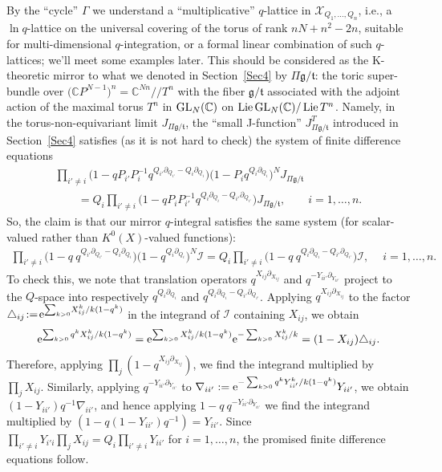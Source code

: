 \documentclass[10pt,a4paper]{amsart}
\numberwithin{equation}{section}
\def\I{\mathcal I}
\def\X{\mathcal X}
\def\CC{\mathbb C}
\def\p{\partial}
\def\Lie{\operatorname{Lie}}
\renewcommand{\Delta}{\triangle}
\theoremstyle{definition}
\theoremstyle{plain}
\begin{document}
By the ``cycle'' $\Gamma$ we understand a ``multiplicative'' $q$-lattice in $\X_{Q_1,\dots,Q_n}$, i.e., a $\ln q$-lattice on the universal covering of the torus of rank $nN+n^2-2n$, suitable for multi-dimensional $q$-integration, or a formal linear combination of such $q$-lattices; we'll meet some examples later. This should be considered as the K-theoretic mirror to what we denoted in Section~\ref{Sec4} by $\Pi \mathfrak{g}/\mathfrak{t}$: the toric super-bundle over $\big(\CC P^{N-1}\big)^n=\CC^{Nn}//T^n$ with the fiber $\mathfrak{g}/\mathfrak{t}$ associated with the adjoint action of the maximal torus $T^n$ in ${\rm GL}_N(\CC)$ on $\Lie {\rm GL}_N(\CC)/\Lie T^n$. Namely, in the torus-non-equivariant limit $J_{\Pi\mathfrak{g}/\mathfrak{t}}$, the ``small J-function'' $J^T_{\Pi \mathfrak{g}/\mathfrak{t}}$ introduced in Section~\ref{Sec4} satisfies (as it is not hard to check) the system of finite difference equations
\begin{gather*}
\prod_{i'\neq i}\big(1-q P_{i'}P_i^{-1}q^{Q_{i'}\p_{Q_{i'}}-Q_i\p_{Q_i}}\big)
\big(1-P_iq^{Q_i\p_{Q_i}}\big)^N J_{\Pi \mathfrak{g}/\mathfrak{t}}
\\ \qquad
{} = Q_i \prod_{i'\neq i} \big(1-q P_iP_{i'}^{-1} q^{Q_i\p_{Q_i}-Q_{i'}\p_{Q_{i'}}}\big) J_{\Pi \mathfrak{g}/\mathfrak{t}},\qquad i=1,\dots, n.
\end{gather*}
So, the claim is that our mirror $q$-integral satisfies the same system (for scalar-valued rather than $K^0(X)$-valued functions):
\begin{gather*}
 \prod_{i'\neq i}\big(1-q\ q^{Q_{i'}\p_{Q_{i'}}-Q_i\p_{Q_i}}\big) \big(1-q^{Q_i\p_{Q_i}}\big)^N \I
 = Q_i\prod_{i'\neq i} \big(1-q\ q^{Q_i\p_{Q_i}-Q_{i'}\p_{Q_{i'}}}\big)\I,\quad\ i=1,\dots, n.
\end{gather*}
To check this, we note that translation operators $q^{X_{ij}\p_{X_{ij}}}$ and $q^{-Y_{ii'}\p_{Y_{ii'}}}$ project to the $Q$-space into respectively $q^{Q_i\p_{Q_i}}$ and $q^{Q_i\p_{Q_i}\!-Q_{i'}\p_{Q_{i'}}}$\!. Applying $q^{X_{ij}\p_{X_{ij}}}$ to the factor $\Delta_{ij}\!:=\!{\rm e}^{\sum_{k>0}\!X_{ij}^k/k(1-q^k)}$ in the integrand of $\I$ containing $X_{ij}$, we obtain
\[
{\rm e}^{\sum_{k>0} q^kX_{ij}^k/k(1-q^k)}={\rm e}^{\sum_{k>0}X_{ij}^k/k(1-q^k)}{\rm e}^{-\sum_{k>0}X_{ij}^k/k}=(1-X_{ij}) \Delta_{ij}.
\]
Therefore, applying $\prod_j(1-q^{X_{ij}\p_{X_{ij}}})$, we find the integrand multiplied by $\prod_j X_{ij}$. Similarly, applying $q^{-Y_{ii'}\p_{Y_{ii'}}}$ to $\nabla_{ii'}:={\rm e}^{-\sum_{k>0}q^kY_{ii'}^{k}/k(1-q^k)}Y_{ii'}$,
we obtain $(1-Y_{ii'})q^{-1}\nabla_{ii'}$, and hence applying $1-q\ q^{-Y_{ii'}\p_{Y_{ii'}}}$ we find the integrand multiplied by $(1-q (1-Y_{ii'}) q^{-1})=Y_{ii'}$. Since $\prod_{i'\neq i}Y_{i'i}\prod_jX_{ij} =Q_i\prod_{i'\neq i} Y_{ii'}$ for $i=1,\dots, n$, the promised finite difference equations follow.
\end{document}
